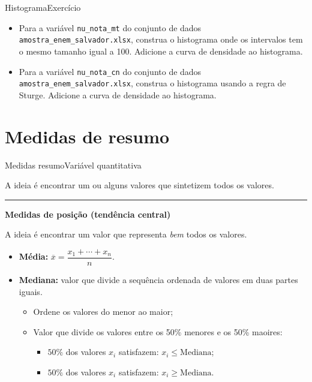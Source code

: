 \documentclass[
  10pt,
  ignorenonframetext,
]{beamer}
\providecommand{\tightlist}{%
  \setlength{\itemsep}{0pt}\setlength{\parskip}{0pt}}\usepackage{longtable,booktabs,array}
\newcommand*{\regrafina}{\rule{\textwidth}{0.5pt}}
\begin{document}
\begin{frame}[fragile]{Histograma\newline Exercício}
\protect\hypertarget{histogramaexercuxedcio-1}{}
\begin{itemize}
\tightlist
\item
  Para a variável \texttt{nu\_nota\_mt} do conjunto de dados
  \texttt{amostra\_enem\_salvador.xlsx}, construa o histograma onde os
  intervalos tem o mesmo tamanho igual a 100. Adicione a curva de
  densidade ao histograma.
\item
  Para a variável \texttt{nu\_nota\_cn} do conjunto de dados
  \texttt{amostra\_enem\_salvador.xlsx}, construa o histograma usando a
  regra de Sturge. Adicione a curva de densidade ao histograma.
\end{itemize}
\end{frame}

\hypertarget{medidas-de-resumo}{%
\section{Medidas de resumo}\label{medidas-de-resumo}}

\begin{frame}{Medidas resumo\newline Variável quantitativa}
\protect\hypertarget{medidas-resumovariuxe1vel-quantitativa}{}
\small

A ideia é encontrar um ou alguns valores que sintetizem todos os
valores.

\regrafina

\textbf{Medidas de posição (tendência central)}

A ideia é encontrar um valor que representa \emph{bem} todos os valores.

\begin{itemize}
\tightlist
\item
  \textbf{Média:} \(\overline{x} = \dfrac{x_1+\cdots+x_n}{n}\).
\item
  \textbf{Mediana:} valor que divide a sequência ordenada de valores em
  duas partes iguais.

  \begin{itemize}
  \tightlist
  \item
    Ordene os valores do menor ao maior;
  \item
    Valor que divide os valores entre os 50\% menores e os 50\% maoires:

    \begin{itemize}
    \tightlist
    \item
      \(50\%\) dos valores \(x_i\) satisfazem:
      \(x_i \leq \text{Mediana}\);
    \item
      \(50\%\) dos valores \(x_i\) satisfazem:
      \(x_i \geq \text{Mediana}\).
    \end{itemize}
  \end{itemize}
\end{itemize}
\end{frame}
\end{document}
